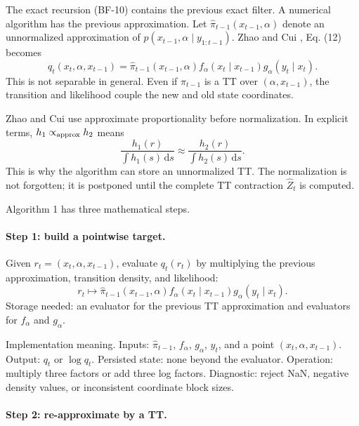 \documentclass[11pt]{article}
\numberwithin{equation}{section}
\newcommand{\dd}{\,\mathrm d}
\begin{document}
The exact recursion (BF-10) contains the previous exact filter.  A numerical
algorithm has the previous approximation.  Let
\(\widehat\pi_{t-1}(x_{t-1},\alpha)\) denote an unnormalized approximation of
\(p(x_{t-1},\alpha\mid y_{1:t-1})\).  Zhao and Cui \cite{zhao2024ttsequential}, Eq. (12) becomes
\begin{equation}
    q_t(x_t,\alpha,x_{t-1})
    =
    \widehat\pi_{t-1}(x_{t-1},\alpha)
    f_\alpha(x_t\mid x_{t-1})
    g_\alpha(y_t\mid x_t).
    \label{eq:p24-a1-1}
\end{equation}
This is not separable in general.  Even if
\(\widehat\pi_{t-1}\) is a TT over \((\alpha,x_{t-1})\), the transition and
likelihood couple the new and old state coordinates.

Zhao and Cui \cite{zhao2024ttsequential} use approximate proportionality before normalization.  In explicit
terms, \(h_1\propto_{\rm approx} h_2\) means
\begin{equation}
    \frac{h_1(r)}{\int h_1(s)\dd s}
    \approx
    \frac{h_2(r)}{\int h_2(s)\dd s}.
    \label{eq:p24-a1-0}
\end{equation}
This is why the algorithm can store an unnormalized TT.  The normalization is
not forgotten; it is postponed until the complete TT contraction
\(\widehat Z_t\) is computed.

Algorithm 1 has three mathematical steps.

\paragraph{Step 1: build a pointwise target.}
Given \(r_t=(x_t,\alpha,x_{t-1})\), evaluate \(q_t(r_t)\) by multiplying the
previous approximation, transition density, and likelihood:
\[
    r_t\mapsto
    \widehat\pi_{t-1}(x_{t-1},\alpha)
    f_\alpha(x_t\mid x_{t-1})
    g_\alpha(y_t\mid x_t).
\]
Storage needed: an evaluator for the previous TT approximation and evaluators
for \(f_\alpha\) and \(g_\alpha\).

Implementation meaning. Inputs:
\(\widehat\pi_{t-1}\), \(f_\alpha\), \(g_\alpha\), \(y_t\), and a point
\((x_t,\alpha,x_{t-1})\).  Output: \(q_t\) or \(\log q_t\).  Persisted state:
none beyond the evaluator.  Operation: multiply three factors or add three log
factors.  Diagnostic: reject NaN, negative density values, or inconsistent
coordinate block sizes.

\paragraph{Step 2: re-approximate by a TT.}
\end{document}
